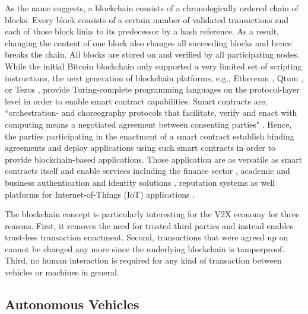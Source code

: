 \documentclass{llncs}
\begin{document}
{			As the name suggests, a blockchain consists of a chronologically ordered chain of blocks. Every block consists of a certain number of validated transactions and each of those block links to its predecessor by a hash reference. As a result, changing the content of one block also changes all succeeding blocks and hence breaks the chain. All blocks are stored on and verified by all participating nodes. While the initial Bitcoin blockchain only supported a very limited set of scripting instructions, the next generation of blockchain platforms, e.g., Ethereum \cite{wood2014ethereum}, Qtum \cite{qtumWhitepaper}, or Tezos \cite{tezosWhitepaper}, provide Turing-complete programming languages on the protocol-layer level in order to enable smart contract capabilities. Smart contracts are, ``orchestration- and choreography protocols that facilitate, verify and enact with computing means a negotiated agreement between consenting parties" \cite{qtumWhitepaper}. Hence, the parties participating in the enactment of a smart contract establish binding agreements and deploy applications using such smart contracts in order to provide blockchain-based applications. Those application are as versatile as smart contracts itself and enable services including the finance sector \cite{nguyen2016blockchain}\cite{saltWhitepaper}, academic and business authentication and identity solutions \cite{leidingUnchained}\cite{CivicWhitepaper}\cite{AuthcoinLeiding2016MCIS}\cite{mccorry2015authenticated}\cite{SelfkeyWhitepaper}, reputation systems \cite{SemadaWhitepaper} as well platforms for Internet-of-Things (IoT) applications \cite{christidis2016blockchains}\cite{ouaddah2017towards}. 	
			
			The blockchain concept is particularly interesting for the V2X economy for three reasons. First, it removes the need for trusted third parties and instead enables trust-less transaction enactment. Second, transactions that were agreed up on cannot be changed any more since the underlying blockchain is tamperproof. Third, no human interaction is required for any kind of transaction between vehicles or machines in general.

		
		\subsection{Autonomous Vehicles}
			\label{ss:autonomous-vehicles}
			
}
\end{document}
